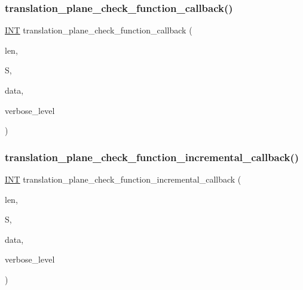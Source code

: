 \mbox{\label{translation__plane2_8_c_a801520ddddd2cf0584b339285d489b73}} 
\subsubsection{\texorpdfstring{translation\+\_\+plane\+\_\+check\+\_\+function\+\_\+callback()}{translation\_plane\_check\_function\_callback()}}
{\footnotesize\ttfamily \mbox{\hyperlink{galois_8h_a09fddde158a3a20bd2dcadb609de11dc}{I\+NT}} translation\+\_\+plane\+\_\+check\+\_\+function\+\_\+callback (\begin{DoxyParamCaption}\item[{\mbox{\hyperlink{galois_8h_a09fddde158a3a20bd2dcadb609de11dc}{I\+NT}}}]{len,  }\item[{\mbox{\hyperlink{galois_8h_a09fddde158a3a20bd2dcadb609de11dc}{I\+NT}} $\ast$}]{S,  }\item[{void $\ast$}]{data,  }\item[{\mbox{\hyperlink{galois_8h_a09fddde158a3a20bd2dcadb609de11dc}{I\+NT}}}]{verbose\+\_\+level }\end{DoxyParamCaption})}

\mbox{\label{translation__plane2_8_c_aae790edc56ca12404a0fd196d3ea9590}} 
\subsubsection{\texorpdfstring{translation\+\_\+plane\+\_\+check\+\_\+function\+\_\+incremental\+\_\+callback()}{translation\_plane\_check\_function\_incremental\_callback()}}
{\footnotesize\ttfamily \mbox{\hyperlink{galois_8h_a09fddde158a3a20bd2dcadb609de11dc}{I\+NT}} translation\+\_\+plane\+\_\+check\+\_\+function\+\_\+incremental\+\_\+callback (\begin{DoxyParamCaption}\item[{\mbox{\hyperlink{galois_8h_a09fddde158a3a20bd2dcadb609de11dc}{I\+NT}}}]{len,  }\item[{\mbox{\hyperlink{galois_8h_a09fddde158a3a20bd2dcadb609de11dc}{I\+NT}} $\ast$}]{S,  }\item[{void $\ast$}]{data,  }\item[{\mbox{\hyperlink{galois_8h_a09fddde158a3a20bd2dcadb609de11dc}{I\+NT}}}]{verbose\+\_\+level }\end{DoxyParamCaption})}

